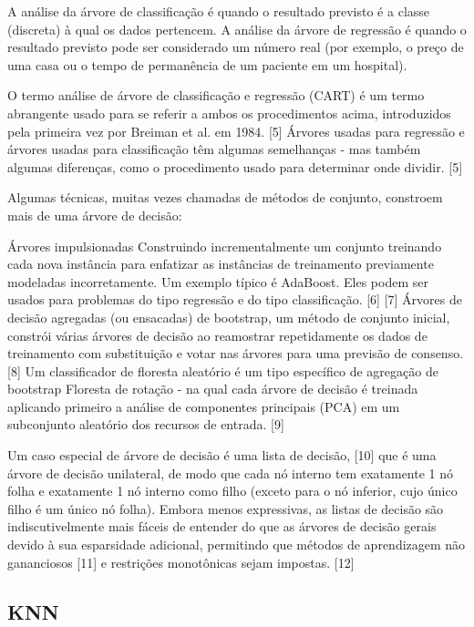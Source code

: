 \documentclass{article}
\begin{document}
    A análise da árvore de classificação é quando o resultado previsto é a classe (discreta) à qual os dados pertencem.
    A análise da árvore de regressão é quando o resultado previsto pode ser considerado um número real (por exemplo, o preço de uma casa ou o tempo de permanência de um paciente em um hospital).

O termo análise de árvore de classificação e regressão (CART) é um termo abrangente usado para se referir a ambos os procedimentos acima, introduzidos pela primeira vez por Breiman et al. em 1984. [5] Árvores usadas para regressão e árvores usadas para classificação têm algumas semelhanças - mas também algumas diferenças, como o procedimento usado para determinar onde dividir. [5]

Algumas técnicas, muitas vezes chamadas de métodos de conjunto, constroem mais de uma árvore de decisão:

    Árvores impulsionadas Construindo incrementalmente um conjunto treinando cada nova instância para enfatizar as instâncias de treinamento previamente modeladas incorretamente. Um exemplo típico é AdaBoost. Eles podem ser usados para problemas do tipo regressão e do tipo classificação. [6] [7]
    Árvores de decisão agregadas (ou ensacadas) de bootstrap, um método de conjunto inicial, constrói várias árvores de decisão ao reamostrar repetidamente os dados de treinamento com substituição e votar nas árvores para uma previsão de consenso. [8]
        Um classificador de floresta aleatório é um tipo específico de agregação de bootstrap
    Floresta de rotação - na qual cada árvore de decisão é treinada aplicando primeiro a análise de componentes principais (PCA) em um subconjunto aleatório dos recursos de entrada. [9]

Um caso especial de árvore de decisão é uma lista de decisão, [10] que é uma árvore de decisão unilateral, de modo que cada nó interno tem exatamente 1 nó folha e exatamente 1 nó interno como filho (exceto para o nó inferior, cujo único filho é um único nó folha). Embora menos expressivas, as listas de decisão são indiscutivelmente mais fáceis de entender do que as árvores de decisão gerais devido à sua esparsidade adicional, permitindo que métodos de aprendizagem não gananciosos [11] e restrições monotônicas sejam impostas. [12]

\subsection{KNN}
\end{document}
